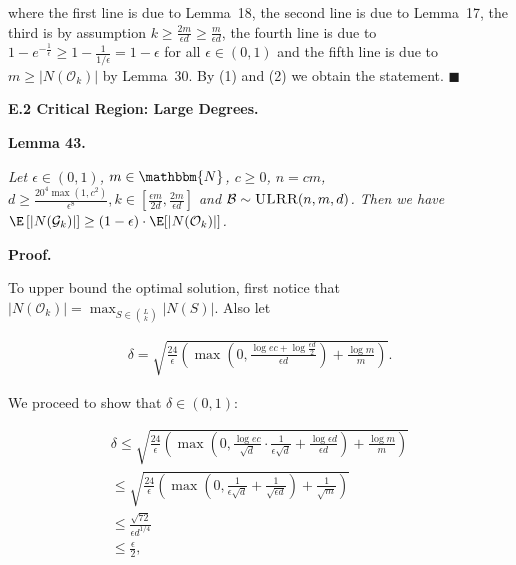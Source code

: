 where the first line is due to Lemma 18, the second line is due to Lemma 17, the third is by assumption $k\geq\frac{2m}{\epsilon d}\geq\frac{m}{\epsilon d}$, the fourth line is due to $1-e^{-\frac{1}{\epsilon}}\geq 1-\frac{1}{1/\epsilon}=1-\epsilon$ for all $\epsilon\in(0,1)$ and the fifth line is due to $m\geq|N(\mathcal{O}_{k})|$ by Lemma 30.
By (1) and (2) we obtain the statement.
\ensuremath{\blacksquare}\par






\par\medskip\noindent\textbf{E.2 Critical Region: Large Degrees.}\par





\par\medskip\noindent\textbf{\textbf{Lemma 43}\textbf{.}}\par



\emph{Let $\epsilon\in(0,1)$, $m\in\mathbbm{N}$, $c\geq 0$, $n=cm$, $d\geq\frac{20^{4}\max(1,c^{2})}{\epsilon^{8}},k\in[\frac{\epsilon m}{2d},\frac{2m}{\epsilon d}]$ and $\mathcal{B}\sim\textsc{ULRR}(n,m,d)$.
Then we have $\E\left[|N(\mathcal{G}_{k})|\right]\geq\left(1-\epsilon\right)\cdot\E[|N(\mathcal{O}_{k})|]$.}\par






\par\medskip\noindent\textbf{Proof.}\par



To upper bound the optimal solution, first notice that $|N(\mathcal{O}_{k})|=\max_{S\in\binom{L}{k}}|N(S)|$.
Also let\par


\[\begin{gathered}
\delta=\sqrt{\frac{24}{\epsilon}\left(\max\left(0,\frac{\log{ec}+\log{\frac{\epsilon d}{2}}}{\epsilon d}\right)+\frac{\log{m}}{m}\right)}.
\end{gathered}\]


We proceed to show that $\delta\in(0,1)$:\par


\[\begin{gathered}
\displaystyle\delta \displaystyle\leq\sqrt{\frac{24}{\epsilon}\left(\max\left(0,\frac{\log{ec}}{\sqrt{d}}\cdot\frac{1}{\epsilon\sqrt{d}}+\frac{\log{\epsilon d}}{\epsilon d}\right)+\frac{\log{m}}{m}\right)} \\
\displaystyle\leq\sqrt{\frac{24}{\epsilon}\left(\max\left(0,\frac{1}{\epsilon\sqrt{d}}+\frac{1}{\sqrt{\epsilon d}}\right)+\frac{1}{\sqrt{m}}\right)} \\
\displaystyle\leq\frac{\sqrt{72}}{\epsilon d^{1/4}} \\
\displaystyle\leq\frac{\epsilon}{2},
\end{gathered}\]


